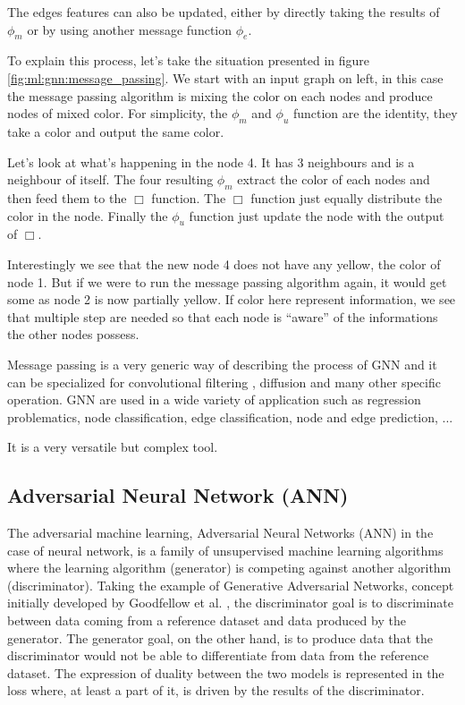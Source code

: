 \documentclass[../main.tex]{subfiles}
\begin{document}
The edges features can also be updated, either by directly taking the results of $\phi_m$ or by using another message function $\phi_e$.

To explain this process, let's take the situation presented in figure \ref{fig:ml:gnn:message_passing}. We start with an input graph on left, in this case the message passing algorithm is mixing the color on each nodes and produce nodes of mixed color. For simplicity, the $\phi_m$ and $\phi_u$ function are the identity, they take a color and output the same color.

Let's look at what's happening in the node 4. It has 3 neighbours and is a neighbour of itself. The four resulting $\phi_m$ extract the color of each nodes and then feed them to the $\Box$ function. The $\Box$ function just equally distribute the color in the node. Finally the $\phi_u$ function just update the node with the output of $\Box$.

Interestingly we see that the new node 4 does not have any yellow, the color of node 1. But if we were to run the message passing algorithm again, it would get some as node 2 is now partially yellow. If color here represent information, we see that multiple step are needed so that each node is ``aware'' of the informations the other nodes possess.


Message passing is a very generic way of describing the process of GNN and it can be specialized for convolutional filtering \cite{defferrard_convolutional_2017}, diffusion \cite{li_diffusion_2018} and many other specific operation. GNN are used in a wide variety of application such as regression problematics, node classification, edge classification, node and edge prediction, ...


It is a very versatile but complex tool.

\subsection{Adversarial Neural Network (ANN)}

The adversarial machine learning, Adversarial Neural Networks (ANN) in the case of neural network, is a family of unsupervised machine learning algorithms where the learning algorithm (generator) is competing against another algorithm (discriminator). Taking the example of Generative Adversarial Networks, concept initially developed by Goodfellow et al. \cite{goodfellow_generative_2014}, the discriminator goal is to discriminate between data coming from a reference dataset and data produced by the generator.
The generator goal, on the other hand, is to produce data that the discriminator would not be able to differentiate from data from the reference dataset. The expression of duality between the two models is represented in the loss where, at least a part of it, is driven by the results of the discriminator.
\end{document}
